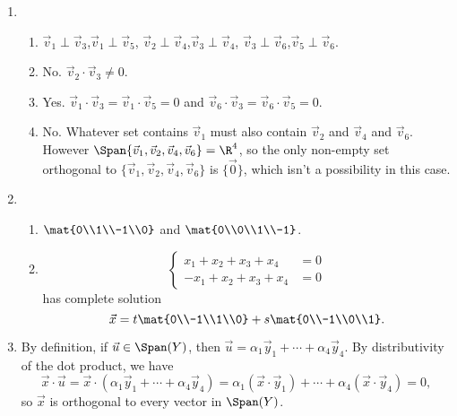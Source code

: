 		\begin{enumerate}
			\item
			\begin{enumerate}
				\item
				$\vec v_1\perp \vec v_3$,\quad  $\vec v_1\perp \vec v_5$, \quad
				$\vec v_2\perp\vec v_4$,\quad  $\vec v_3\perp \vec v_4$,\quad
				$\vec v_3\perp \vec v_6$,\quad  $\vec v_5\perp \vec v_6$.

				\item No. $\vec v_2\cdot \vec v_3\neq 0$.
				\item Yes. $\vec v_1\cdot \vec v_3=\vec v_1\cdot \vec v_5=0$ and
					$\vec v_6\cdot \vec v_3=\vec v_6\cdot \vec v_5=0$.
				\item No. Whatever set contains $\vec v_1$ must also contain $\vec v_2$ and
					$\vec v_4$ and $\vec v_6$.
					However $\Span\{\vec v_1,\vec v_2,\vec v_4,
					\vec v_6\}=\R^4$, so the only non-empty set orthogonal
					to $\{\vec v_1,\vec v_2,\vec v_4,
					\vec v_6\}$ is $\{\vec 0\}$, which isn't a possibility in this case.
			\end{enumerate}
			\item \begin{enumerate}
					\item $\mat{0\\1\\-1\\0}$ and $\mat{0\\0\\1\\-1}$.
					\item \[
							\begin{cases}x_1+x_2+x_3+x_4&=0\\ -{x_1}+x_2+x_3+x_4&=0\end{cases}
						\]
					has complete solution
					\[
						\vec x = t\mat{0\\-1\\1\\0}+s\mat{0\\-1\\0\\1}.
					\]
			\end{enumerate}

			\item By definition, if $\vec u\in\Span(Y)$, then $\vec u=\alpha_1\vec y_1+\cdots+\alpha_4\vec y_4$.
				By distributivity of the dot product, we have
				\[
					\vec x\cdot \vec u = \vec x\cdot (\alpha_1\vec y_1+\cdots+\alpha_4\vec y_4)
					=\alpha_1(\vec x\cdot \vec y_1)+\cdots +\alpha_4(\vec x\cdot \vec y_4)=0,
				\]
				so $\vec x$ is orthogonal to every vector in $\Span(Y)$.


\end{enumerate}

